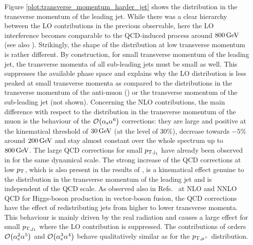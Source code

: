 \documentclass[a4article,11pt]{article}
\begin{document}
Figure \ref{plot:transverse_momentum_harder_jet} shows the
distribution in the transverse momentum of the leading jet.  While
there was a clear hierarchy between the LO contributions in the
previous observable, here the LO interference becomes comparable to
the QCD-induced process around $800\,\text{GeV}$ (see also
).  Strikingly, the shape of the
distribution at low transverse momentum is rather different.  By
construction, for small transverse momentum of the leading jet, the
transverse momenta of all sub-leading jets must be small as well. This
suppresses the available phase space and explains why the LO
distribution is less peaked at small transverse momenta as compared to
the distributions in the transverse momentum of the anti-muon
() or the transverse momentum
of the sub-leading jet (not shown).  Concerning the NLO contributions,
the main difference with respect to the distribution in the transverse
momentum of the muon is the behaviour of the
$\mathcal{O}{\left(\alpha_\text{s}\alpha^{6}\right)}$ corrections: they are
large and positive at the kinematical threshold of $30\,\text{GeV}$ (at the
level of $30\%$), decrease towards $-5\%$ around $200\,\text{GeV}$ and stay
almost constant over the whole spectrum up to $800\,\text{GeV}$.
The large QCD corrections for small $p_{{\mathrm{T}},\text{j}_1}$ have 
already been observed in  for the
same dynamical scale.  The strong increase of the QCD corrections at
low $p_{\rm T}$, which is also present in the results of
, is a kinematical effect genuine to the
distribution in the transverse momentum of the leading jet and is
independent of the QCD scale.  As observed also in
Refs.~\cite{Cacciari:2015jma,Rauch:2017cfu} at NLO and NNLO QCD for
Higgs-boson production in vector-boson fusion, the QCD corrections
have the effect of redistributing jets from higher to lower transverse
momenta.  This behaviour is mainly driven by the real radiation and
causes a large effect for small $p_{{\mathrm{T}},j_1}$ where the LO
contribution is suppressed.
The contributions  of orders
$\mathcal{O}{\left(\alpha_\text{s}^{2}\alpha^{5}\right)}$ and
$\mathcal{O}{\left(\alpha_\text{s}^{3}\alpha^{4}\right)}$ behave qualitatively
similar as for the $p_{{\mathrm{T}},\mu^+}$ distribution.
\end{document}
